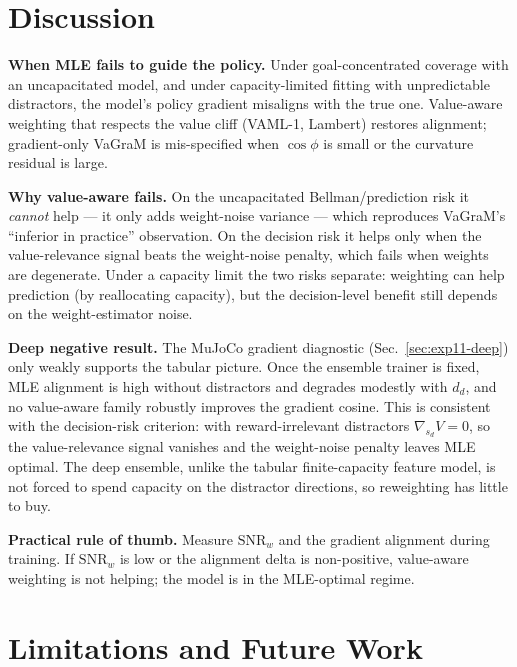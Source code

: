 \documentclass{article}
\theoremstyle{plain}
\begin{document}
\section{Discussion}

\textbf{When MLE fails to guide the policy.} Under goal-concentrated coverage with an
uncapacitated model, and under capacity-limited fitting with unpredictable distractors,
the model's policy gradient misaligns with the true one. Value-aware weighting that
respects the value cliff (VAML-1, Lambert) restores alignment; gradient-only VaGraM is
mis-specified when $\cos\phi$ is small or the curvature residual is large.

\textbf{Why value-aware fails.} On the uncapacitated Bellman/prediction risk it
\emph{cannot} help --- it only adds weight-noise variance --- which reproduces VaGraM's
``inferior in practice'' observation. On the decision risk it helps only when the
value-relevance signal beats the weight-noise penalty, which fails when weights are
degenerate. Under a capacity limit the two risks separate: weighting can help prediction
(by reallocating capacity), but the decision-level benefit still depends on the
weight-estimator noise.

\textbf{Deep negative result.} The MuJoCo gradient diagnostic
(Sec.~\ref{sec:exp11-deep}) only weakly supports the tabular picture. Once the ensemble
trainer is fixed, MLE alignment is high without distractors and degrades modestly with
$d_d$, and no value-aware family robustly improves the gradient cosine. This is consistent
with the decision-risk criterion: with reward-irrelevant distractors
$\nabla_{s_d} V = 0$, so the value-relevance signal vanishes and the weight-noise penalty
leaves MLE optimal. The deep ensemble, unlike the tabular finite-capacity feature model,
is not forced to spend capacity on the distractor directions, so reweighting has little to
buy.

\textbf{Practical rule of thumb.} Measure $\mathrm{SNR}_w$ and the gradient alignment
during training. If $\mathrm{SNR}_w$ is low or the alignment delta is non-positive,
value-aware weighting is not helping; the model is in the MLE-optimal regime.

\section{Limitations and Future Work}
\end{document}
